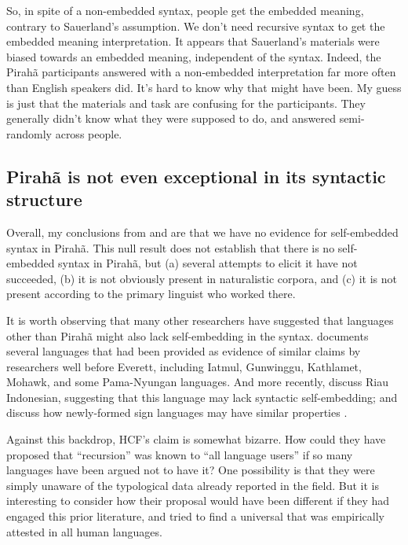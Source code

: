 \documentclass{article}
\begin{document}
So, in spite of a non-embedded syntax, people get the embedded meaning, contrary to Sauerland’s assumption.  We don’t need recursive syntax to get the embedded meaning interpretation.  It appears that Sauerland's materials were biased towards an embedded meaning, independent of the syntax. Indeed, the Pirahã participants answered with a non-embedded interpretation far more often than English speakers did. It's hard to know why that might have been.  My guess is just that the materials and task are confusing for the participants.  They generally didn't know what they were supposed to do, and answered semi-randomly across people.

\subsection{Pirahã is not even exceptional in its syntactic structure}

Overall, my conclusions from \cite{futrell2016corpus} and \cite{sauerland2018false} are that we have no evidence for self-embedded syntax in Pirahã. This null result does not establish that there is no self-embedded syntax in Pirahã, but (a) several attempts to elicit it have not succeeded, (b) it is not obviously present in naturalistic corpora, and (c) it is not present according to the primary linguist who worked there.

It is worth observing that many other researchers have suggested that languages other than Pirahã might also lack self-embedding in the syntax. \cite{pullum2023daniel} documents several languages that had been provided as evidence of similar claims by researchers well before Everett, including Iatmul, Gunwinggu, Kathlamet, Mohawk, and some Pama-Nyungan languages. And more recently, \cite{gil2009much, jackendoff2014what, gil2023hierarchical} discuss Riau Indonesian, suggesting that this language may lack syntactic self-embedding; and \cite{jackendoff2014what} discuss how newly-formed sign languages may have similar properties \citep{goldin2005resilience, sandler2005emergence}.

Against this backdrop, HCF's claim is somewhat bizarre. How could they have proposed that ``recursion'' was known to ``all language users'' if so many languages have been argued not to have it? One possibility is that they were simply unaware of the typological data already reported in the field. But it is interesting to consider how their proposal would have been different if they had engaged this prior literature, and tried to find a universal that was empirically attested in all human languages. 
\end{document}
